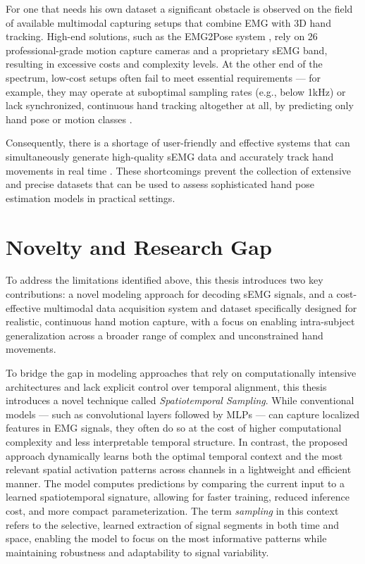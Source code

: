 For one that needs his own dataset a significant obstacle is observed on the field of available multimodal capturing setups that combine EMG with 3D hand tracking. High-end solutions, such as the EMG2Pose system \cite{salter2024emg2pose}, rely on 26 professional-grade motion capture cameras and a proprietary sEMG band, resulting in excessive costs and complexity levels. At the other end of the spectrum, low-cost setups often fail to meet essential requirements — for example, they may operate at suboptimal sampling rates (e.g., below 1kHz) or lack synchronized, continuous hand tracking altogether at all, by predicting only hand pose or motion classes \cite{nasri2020semg}.

Consequently, there is a shortage of user-friendly and effective systems that can simultaneously generate high-quality sEMG data and accurately track hand movements in real time \cite{graf2023combining}. These shortcomings prevent the collection of extensive and precise datasets that can be used to assess sophisticated hand pose estimation models in practical settings.

\section{Novelty and Research Gap}

To address the limitations identified above, this thesis introduces two key contributions: a novel modeling approach for decoding sEMG signals, and a cost-effective multimodal data acquisition system and dataset specifically designed for realistic, continuous hand motion capture, with a focus on enabling intra-subject generalization across a broader range of complex and unconstrained hand movements.

To bridge the gap in modeling approaches that rely on computationally intensive architectures and lack explicit control over temporal alignment, this thesis introduces a novel technique called \textit{Spatiotemporal Sampling}. While conventional models — such as convolutional layers followed by MLPs — can capture localized features in EMG signals, they often do so at the cost of higher computational complexity and less interpretable temporal structure. In contrast, the proposed approach dynamically learns both the optimal temporal context and the most relevant spatial activation patterns across channels in a lightweight and efficient manner. The model computes predictions by comparing the current input to a learned spatiotemporal signature, allowing for faster training, reduced inference cost, and more compact parameterization. The term \textit{sampling} in this context refers to the selective, learned extraction of signal segments in both time and space, enabling the model to focus on the most informative patterns while maintaining robustness and adaptability to signal variability.

